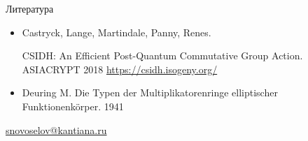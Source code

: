 \documentclass{beamer}
\begin{document}
\begin{frame}{Литература}
	\begin{scriptsize}
			\begin{itemize}
			\item[\structure{{\faScroll}}] Castryck, Lange, Martindale, Panny,  Renes.
			
			CSIDH: An Efficient Post-Quantum Commutative Group Action. ASIACRYPT 2018
			\url{https://csidh.isogeny.org/}
			
			\item[\structure{{\faScroll}}] Deuring M. Die Typen der Multiplikatorenringe elliptischer Funktionenkörper. 1941
		\end{itemize}
	\end{scriptsize}

    \begin{center}
        \begin{tcolorbox}[enhanced,hbox,colback=block-green-color-bg,colframe=subsection-color!120,title=Контакты,center title]
            \begin{varwidth}{\textwidth}
                \begin{center}
                    \href{mailto:snovoselov@kantiana.ru}{snovoselov@kantiana.ru}
                \end{center}
            \end{varwidth}
        \end{tcolorbox}
    \end{center}\end{frame}
\end{document}
